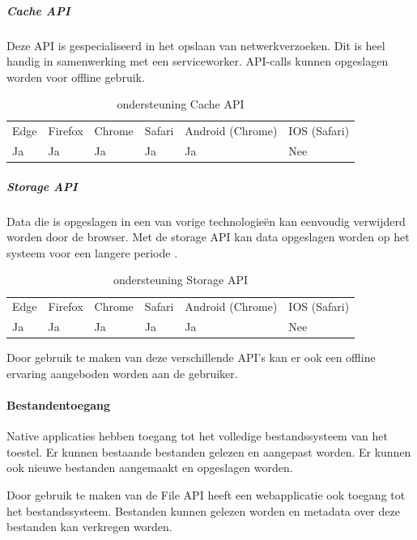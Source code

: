 	
	\subparagraph{Cache API}
	Deze API is gespecialiseerd in het opslaan van netwerkverzoeken. Dit is heel handig in samenwerking met een serviceworker. API-calls kunnen opgeslagen worden voor offline gebruik.
	\autocite{vanKesteren2020}
	
	\begin{table}[H]
		\centering
			\begin{tabular}{llllll}
				Edge & Firefox & Chrome & Safari & Android (Chrome) & IOS (Safari) \\
				Ja   & Ja      &  Ja     & Ja     & Ja               & Nee          
			\end{tabular}	
			\caption{ondersteuning Cache API}
			\label{ondersteuning Cache API}
	\end{table}
	
	
	\subparagraph{Storage API}
	Data die is opgeslagen in een van vorige technologieën kan eenvoudig verwijderd worden door de browser. Met de storage API kan data opgeslagen worden op het systeem voor een langere periode .
	\autocite{Mozilla2020b}
	
	\begin{table}[H]
		\centering
		\begin{tabular}{llllll}
			Edge & Firefox & Chrome & Safari & Android (Chrome) & IOS (Safari) \\
			Ja   & Ja      &  Ja     & Ja     & Ja               & Nee          
		\end{tabular}	
		\caption{ondersteuning Storage API}
		\label{ondersteuning Storage API}
	\end{table}
	
	
	
Door gebruik te maken van deze verschillende API’s kan er ook een offline ervaring aangeboden worden aan de gebruiker. 
	
\paragraph{Bestandentoegang}

Native applicaties hebben toegang tot het volledige bestandssysteem van het toestel. Er kunnen bestaande bestanden gelezen en aangepast worden. Er kunnen ook nieuwe bestanden aangemaakt en opgeslagen worden.

Door gebruik te maken van de File API \autocite{Kruisselbrink2020} heeft een webapplicatie ook toegang tot het bestandssysteem. Bestanden kunnen gelezen worden en metadata over deze bestanden kan verkregen worden.

